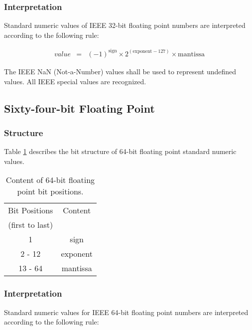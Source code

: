 \subsubsection{Interpretation}
   Standard numeric values of IEEE
   32-bit floating point numbers are 
   interpreted according to the following rule:    
   
    \begin{eqnarray}  
          value & = & (-1)^{\mbox{sign}}   \times 
                      2^{(\mbox{exponent}-127)} \times
                      \mbox{mantissa}
      \end{eqnarray}  
   
    The IEEE NaN (Not-a-Number) values
    shall be used to represent
    undefined values.  All IEEE
    special values are recognized.
    
   \subsection{Sixty-four-bit Floating Point}
  
    \subsubsection{Structure}
    Table \ref{t:s64} describes the bit structure of 64-bit floating 
    point standard numeric values.

     \begin{table}[htpb]  
      \begin{center}
         \begin{tabular}{cc}             \\
           Bit Positions    &  Content   \\
           (first to last)  &            \\ \hline
                        1   &  sign      \\
                   2 - 12   &  exponent  \\
                  13 - 64   &  mantissa  \\
         \end{tabular}
      \end{center}
      \caption{Content of 64-bit floating point bit positions.}
      \label{t:s64}
    \end{table}
  
\subsubsection{Interpretation}
      Standard numeric values for IEEE 
      64-bit floating point numbers are 
      interpreted according to the following rule:    
      
